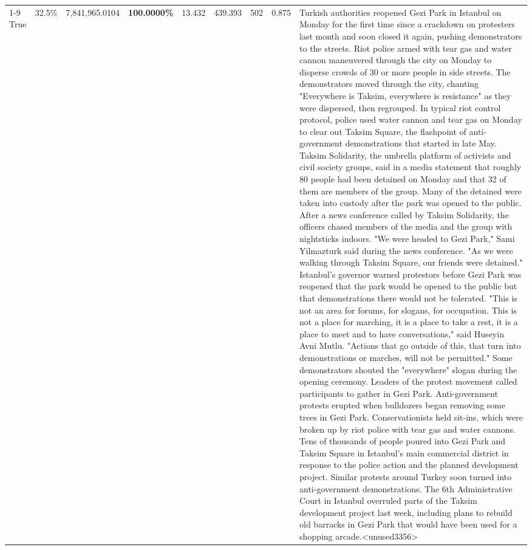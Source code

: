 \begin{table}[H]
\begin{tabular}{lllrlllll}
\cline{1-9}
True & 32.5\% & 7,841,965.0104 & \bfseries \color{red} 100.0000\% & 13.432 & 439.393 & 502 & 0.875 & Turkish authorities reopened Gezi Park in Istanbul on Monday for the first time since a crackdown on protesters last month and soon closed it again, pushing demonstrators to the streets. Riot police armed with tear gas and water cannon maneuvered through the city on Monday to disperse crowds of 30 or more people in side streets. The demonstrators moved through the city, chanting "Everywhere is Taksim, everywhere is resistance" as they were dispersed, then regrouped. In typical riot control protocol, police used water cannon and tear gas on Monday to clear out Taksim Square, the flashpoint of anti-government demonstrations that started in late May. Taksim Solidarity, the umbrella platform of activists and civil society groups, said in a media statement that roughly 80 people had been detained on Monday and that 32 of them are members of the group. Many of the detained were taken into custody after the park was opened to the public. After a news conference called by Taksim Solidarity, the officers chased members of the media and the group with nightsticks indoors. "We were headed to Gezi Park," Sami Yilmazturk said during the news conference. "As we were walking through Taksim Square, our friends were detained." Istanbul's governor warned protestors before Gezi Park was reopened that the park would be opened to the public but that demonstrations there would not be tolerated. "This is not an area for forums, for slogans, for occupation. This is not a place for marching, it is a place to take a rest, it is a place to meet and to have conversations," said Huseyin Avni Mutlu. "Actions that go outside of this, that turn into demonstrations or marches, will not be permitted." Some demonstrators shouted the "everywhere" slogan during the opening ceremony. Leaders of the protest movement called participants to gather in Gezi Park. Anti-government protests erupted when bulldozers began removing some trees in Gezi Park. Conservationists held sit-ins, which were broken up by riot police with tear gas and water cannons. Tens of thousands of people poured into Gezi Park and Taksim Square in Istanbul's main commercial district in response to the police action and the planned development project. Similar protests around Turkey soon turned into anti-government demonstrations. The 6th Administrative Court in Istanbul overruled parts of the Taksim development project last week, including plans to rebuild old barracks in Gezi Park that would have been used for a shopping arcade.<unused3356> \\

\end{tabular}
\end{table}
